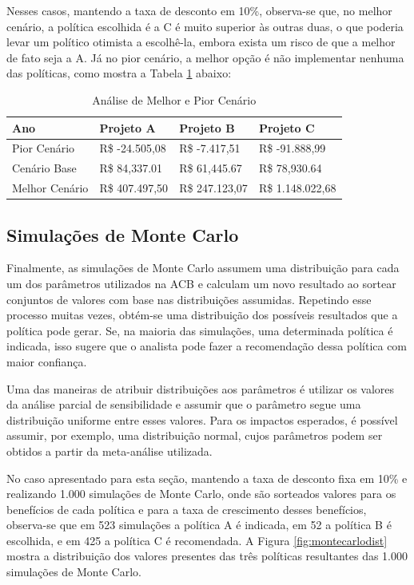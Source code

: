 \documentclass[12pt,letterpaper]{article}
\newcommand{\1}{\mathbbm{1}}
\numberwithin{equation}{section}
\begin{document}
Nesses casos, mantendo a taxa de desconto em 10\%, observa-se que, no melhor cenário, a política escolhida é a C é muito superior às outras duas, o que poderia levar um político otimista a escolhê-la, embora exista um risco de que a melhor de fato seja a A. Já no pior cenário, a melhor opção é não implementar nenhuma das políticas, como mostra a Tabela \ref{tab:melhorpiorcenario} abaixo:

\begin{table}[htbp]
  \centering
  \caption{Análise de Melhor e Pior Cenário}
    \begin{tabular}{|l|l|l|l|}
    \toprule
    Ano   & Projeto A & Projeto B & Projeto C \\
    \midrule
    Pior Cenário &  R\$  -24.505,08  &  R\$    -7.417,51  &  R\$  -91.888,99  \\
    \midrule
    Cenário Base &  R\$    84,337.01  &  R\$    61,445.67  &  R\$    78,930.64  \\
    \midrule
    Melhor Cenário &  R\$    407.497,50  &  R\$    247.123,07  & R\$    1.148.022,68  \\
    \bottomrule
    \end{tabular}%
  \label{tab:melhorpiorcenario}%
\end{table}%

\subsection{Simulações de Monte Carlo}

Finalmente, as simulações de Monte Carlo assumem uma distribuição para cada um dos parâmetros utilizados na ACB e calculam um novo resultado ao sortear conjuntos de valores com base nas distribuições assumidas. Repetindo esse processo muitas vezes, obtém-se uma distribuição dos possíveis resultados que a política pode gerar. Se, na maioria das simulações, uma determinada política é indicada, isso sugere que o analista pode fazer a recomendação dessa política com maior confiança.

Uma das maneiras de atribuir distribuições aos parâmetros é utilizar os valores da análise parcial de sensibilidade e assumir que o parâmetro segue uma distribuição uniforme entre esses valores. Para os impactos esperados, é possível assumir, por exemplo, uma distribuição normal, cujos parâmetros podem ser obtidos a partir da meta-análise utilizada.

No caso apresentado para esta seção, mantendo a taxa de desconto fixa em 10\% e realizando 1.000 simulações de Monte Carlo, onde são sorteados valores para os benefícios de cada política e para a taxa de crescimento desses benefícios, observa-se que em 523 simulações a política A é indicada, em 52 a política B é escolhida, e em 425 a política C é recomendada. A Figura \ref{fig:montecarlodist} mostra a distribuição dos valores presentes das três políticas resultantes das 1.000 simulações de Monte Carlo.
\end{document}
